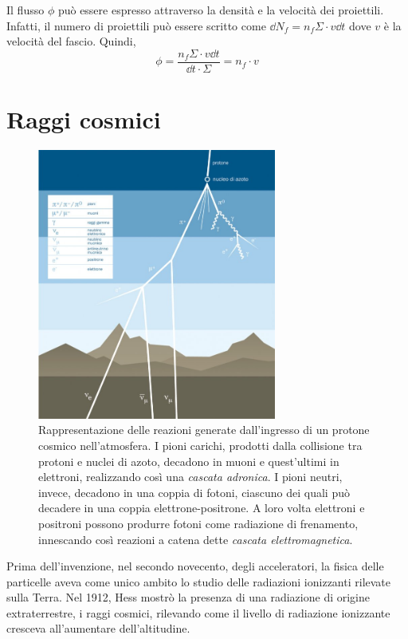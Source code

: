 \documentclass[../main.tex]{subfiles}
\begin{document}
Il flusso $\phi$ può essere espresso attraverso la densità e la velocità dei proiettili. Infatti, il numero di proiettili può essere scritto come $\dd N_f = n_f \Sigma \cdot v \dd t$ dove $v$ è la velocità del fascio. Quindi, 
\begin{equation}
    \phi = \frac{n_f \Sigma \cdot v \dd t}{\dd t \cdot \Sigma} = n_f \cdot v
\end{equation}

\section{Raggi cosmici}
\begin{figure}[b!]
    \centering
    \includegraphics[width=0.7\textwidth]{cosmic.jpg}
    \caption{Rappresentazione delle reazioni generate dall'ingresso di un protone cosmico nell'atmosfera. I pioni carichi, prodotti dalla collisione tra protoni e nuclei di azoto, decadono in muoni e quest'ultimi in elettroni, realizzando così una \emph{cascata adronica}. I pioni neutri, invece, decadono in una coppia di fotoni, ciascuno dei quali può decadere in una coppia elettrone-positrone. A loro volta elettroni e positroni possono produrre fotoni come radiazione di frenamento, innescando così reazioni a catena dette \emph{cascata elettromagnetica}.
    \cite{as10_vdu}}
    \label{fig:cosmic}
\end{figure}
Prima dell'invenzione, nel secondo novecento, degli acceleratori, la fisica delle particelle aveva come unico ambito lo studio delle radiazioni ionizzanti rilevate sulla Terra.
Nel 1912, Hess mostrò la presenza di una radiazione di origine extraterrestre, i raggi cosmici, rilevando come il livello di radiazione ionizzante cresceva all'aumentare dell'altitudine.
\end{document}
